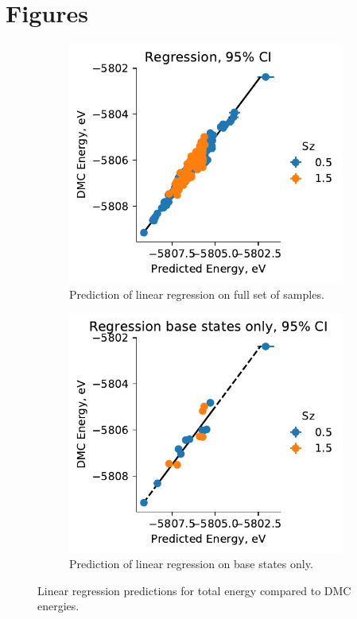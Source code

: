 \documentclass{article}
\begin{document}
\section{Figures}
\begin{figure}[H]
\centering
\begin{subfigure}{.5\textwidth}
  \centering
  \includegraphics[width=\linewidth]{../qwalk/ub3lyp_s1_/analysis/regr_log.pdf}
  \caption{Prediction of linear regression on full set of samples.}
  \label{fig:Regression1}
\end{subfigure}%
\begin{subfigure}{.5\textwidth}
  \centering
  \includegraphics[width=\linewidth]{../qwalk/ub3lyp_s1_/analysis/regr_log_base.pdf}
  \caption{Prediction of linear regression on base states only.}
  \label{fig:Regression2}
\end{subfigure}
\label{fig:Regression}
\caption{Linear regression predictions for total energy compared to DMC energies.}
\end{figure}
\end{document}
